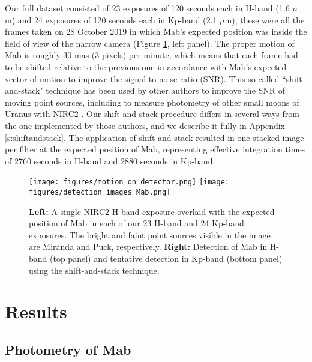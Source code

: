 \documentclass[preprint]{aastex631}
\begin{document}
Our full dataset consisted of 23 exposures of 120 seconds each in H-band (1.6 $\mu$m) and 24 exposures of 120 seconds each in Kp-band (2.1 $\mu$m); these were all the frames taken on 28 October 2019 in which Mab's expected position was inside the field of view of the narrow camera (Figure \ref{fig:detection}, left panel).
The proper motion of Mab is roughly 30 mas (3 pixels) per minute, which means that each frame had to be shifted relative to the previous one in accordance with Mab's expected vector of motion to improve the signal-to-noise ratio (SNR). This so-called ``shift-and-stack" technique has been used by other authors to improve the SNR of moving point sources, including to measure photometry of other small moons of Uranus with NIRC2 \citep[][]{paradis19, paradis23}. Our shift-and-stack procedure differs in several ways from the one implemented by those authors, and we describe it fully in Appendix \ref{s:shiftandstack}. The application of shift-and-stack resulted in one stacked image per filter at the expected position of Mab, representing effective integration times of 2760 seconds in H-band and 2880 seconds in Kp-band.

\begin{figure}
\texttt{[image: figures/motion\_on\_detector.png]}
\texttt{[image: figures/detection\_images\_Mab.png]}
\caption{\textbf{Left:} A single NIRC2 H-band exposure overlaid with the expected position of Mab in each of our 23 H-band and 24 Kp-band exposures. The bright and faint point sources visible in the image are Miranda and Puck, respectively. \textbf{Right:} Detection of Mab in H-band (top panel) and tentative detection in Kp-band (bottom panel) using the shift-and-stack technique.\label{fig:detection}}
\end{figure}

\section{Results}
\label{s:results}

\subsection{Photometry of Mab}
\end{document}
